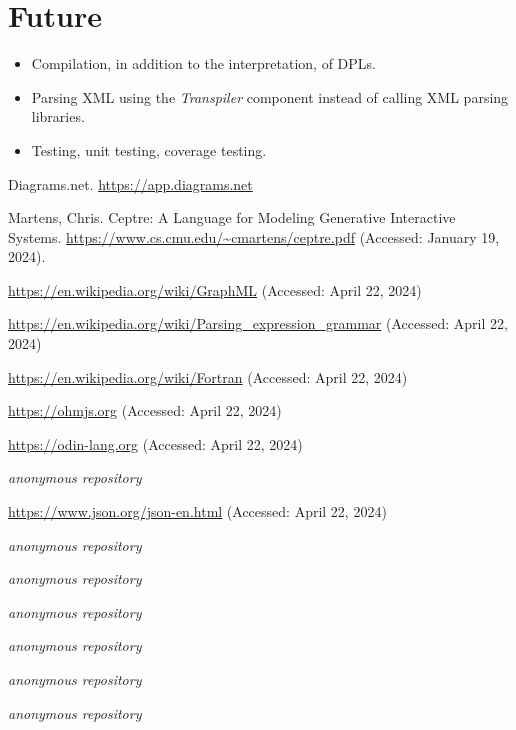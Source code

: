 \documentclass[10pt,anonymous,review]{acmart}
\begin{document}
\section{Future}
\begin{itemize}
\item Compilation, in addition to the interpretation, of DPLs.

\item Parsing XML using the \emph{Transpiler} component instead of calling XML parsing libraries.

\item Testing, unit testing, coverage testing.

\end{itemize}

\begin{thebibliography}{9}

Diagrams.net.
\url{https://app.diagrams.net}

Martens, Chris. Ceptre: A Language for Modeling Generative Interactive Systems. \url{https://www.cs.cmu.edu/~cmartens/ceptre.pdf} (Accessed: January 19, 2024).

\url{https://en.wikipedia.org/wiki/GraphML} (Accessed: April 22, 2024)

\url{https://en.wikipedia.org/wiki/Parsing_expression_grammar} (Accessed: April 22, 2024)

\url{https://en.wikipedia.org/wiki/Fortran} (Accessed: April 22, 2024)

\url{https://ohmjs.org} (Accessed: April 22, 2024)

\url{https://odin-lang.org} (Accessed: April 22, 2024)

\emph{anonymous repository}

\url{https://www.json.org/json-en.html} (Accessed: April 22, 2024)

\emph{anonymous repository}

\emph{anonymous repository}

\emph{anonymous repository}

\emph{anonymous repository}

\emph{anonymous repository}

\emph{anonymous repository}


\end{thebibliography}
\end{document}
